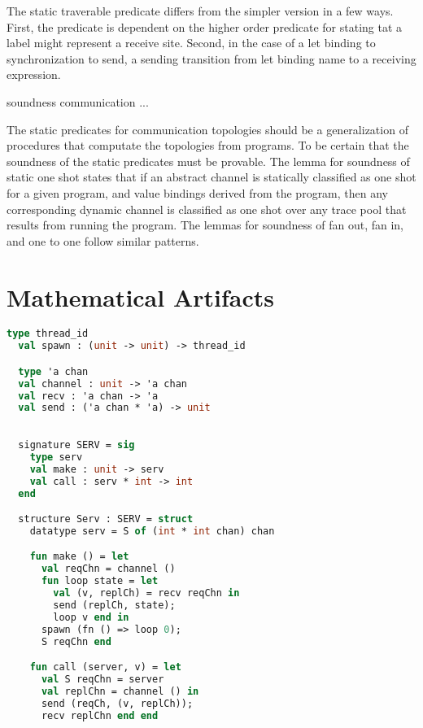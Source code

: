 \documentclass{article}
\begin{document}
The static traverable predicate differs from the simpler version in a few ways.  First, the predicate is dependent on the higher order predicate for stating tat a label might represent a receive site.  Second, in the case of a let binding to synchronization to send, a sending transition from let binding name to a receiving expression.    





soundness communication ... 

The static predicates for communication topologies should be a generalization of procedures that computate the topologies from programs.  To be certain that the soundness of the static predicates must be provable.
The lemma for soundness of static one shot states that if an abstract channel is statically classified as one shot for a given program, and value bindings derived from the program, then any corresponding dynamic channel is classified as one shot over any trace pool that results from running the program.  The lemmas for soundness of fan out, fan in, and one to one follow similar patterns. 







\section{Mathematical Artifacts}

\begin{lstlisting}[language=ML, style=codestyle1]
  type thread_id
  val spawn : (unit -> unit) -> thread_id

  type 'a chan
  val channel : unit -> 'a chan
  val recv : 'a chan -> 'a
  val send : ('a chan * 'a) -> unit
  \end{lstlisting}

\begin{lstlisting}[language=ML, style=codestyle1]

  signature SERV = sig 
    type serv
    val make : unit -> serv
    val call : serv * int -> int
  end

  structure Serv : SERV = struct 
    datatype serv = S of (int * int chan) chan 

    fun make () = let 
      val reqChn = channel ()
      fun loop state = let
        val (v, replCh) = recv reqChn in 
        send (replCh, state);
        loop v end in
      spawn (fn () => loop 0);
      S reqChn end 

    fun call (server, v) = let 
      val S reqChn = server
      val replChn = channel () in 
      send (reqCh, (v, replCh));
      recv replChn end end

  \end{lstlisting}
\end{document}

